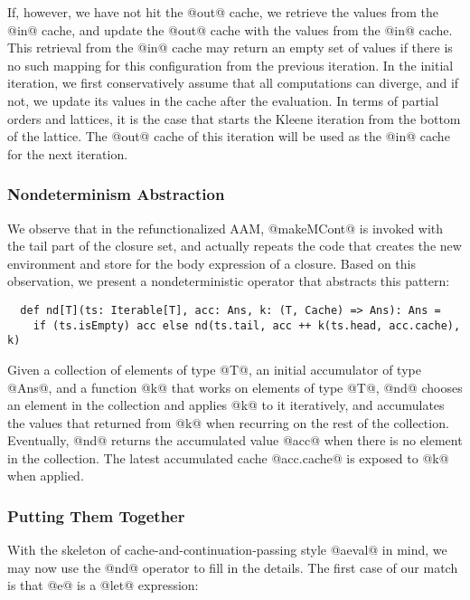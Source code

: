 \documentclass[acmsmall, screen]{acmart}\settopmatter{}
\begin{document}
If, however, we have not hit the @out@ cache, we retrieve the values from the @in@ cache,
and update the @out@ cache with the values from the @in@ cache. This retrieval from the @in@
cache may return an empty set of values if there is no such mapping for this configuration
from the previous iteration.
In the initial iteration, we first conservatively assume that all computations can diverge,
and if not, we update its values in the cache after the evaluation. In terms of partial orders and
lattices, it is the case that starts the Kleene iteration from the bottom of the lattice.
The @out@ cache of this iteration will be used as the @in@ cache for the next iteration.

\subsubsection{Nondeterminism Abstraction}

We observe that in the refunctionalized AAM, @makeMCont@ is invoked with the tail part of
the closure set, and actually repeats the code that creates the new environment and
store for the body expression of a closure.
Based on this observation, we present a nondeterministic operator that abstracts this pattern:

\begin{lstlisting}
  def nd[T](ts: Iterable[T], acc: Ans, k: (T, Cache) => Ans): Ans =
    if (ts.isEmpty) acc else nd(ts.tail, acc ++ k(ts.head, acc.cache), k)
\end{lstlisting}

Given a collection of elements of type @T@, an initial accumulator of
type @Ans@, and a function @k@ that works on elements of type @T@, @nd@
chooses an element in
the collection and applies @k@ to it iteratively, and accumulates the values that
returned from @k@ when recurring on the rest of the collection. Eventually, @nd@
returns the accumulated value @acc@ when there is no element in the collection.
The latest accumulated cache @acc.cache@ is exposed to @k@ when applied.

\subsubsection{Putting Them Together}

With the skeleton of cache-and-continuation-passing style @aeval@ in mind, we may now
use the @nd@ operator to fill in the details. The first case of our
match is that @e@ is a @let@ expression:
\end{document}
